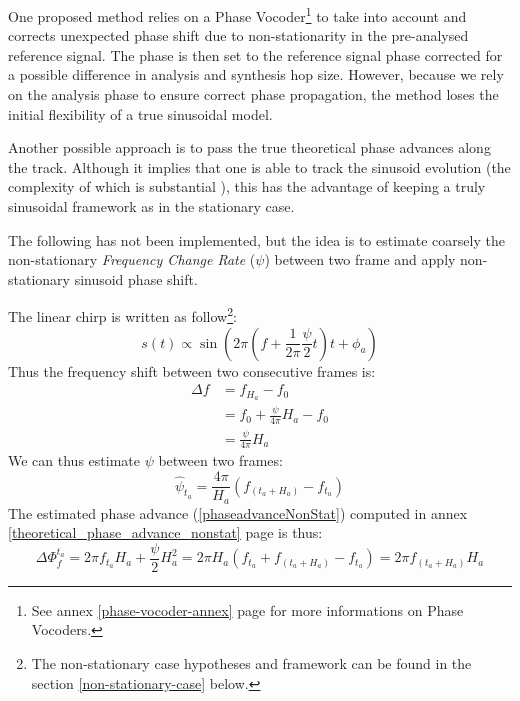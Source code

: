 \documentclass[]{article}
\begin{document}
One proposed method relies on a Phase Vocoder\footnote{See annex \ref{phase-vocoder-annex} page \pageref{phase-vocoder-annex} for more informations on Phase Vocoders.} to take into account and corrects unexpected phase shift due to non-stationarity in the pre-analysed reference signal. The phase is then set to the reference signal phase corrected for a possible difference in analysis and synthesis hop size. However, because we rely on the analysis phase to ensure correct phase propagation, the method loses the initial flexibility of a true sinusoidal model.

Another possible approach is to pass the true theoretical phase advances along the track. Although it implies that one is able to track the sinusoid evolution (the complexity of which is substantial \cite{mcaulay1986speech, serra1989system, karrer2006phavorit}), this has the advantage of keeping a truly sinusoidal framework as in the stationary case.

The following has not been implemented, but the idea is to estimate coarsely the non-stationary \emph{Frequency Change Rate} ($\psi$) between two frame and apply non-stationary sinusoid phase shift.

The linear chirp is written as follow\footnote{The non-stationary case hypotheses and framework can be found in the section \ref{non-stationary-case} below.}:
\begin{equation}
s(t) \propto \sin\left(2\pi\left(f  + \frac{1}{2\pi}\frac{\psi}{2} t\right)t + \phi_a\right)
\end{equation}
Thus the frequency shift between two consecutive frames is:
\begin{equation}
\begin{split}
\Delta f & = f_{H_a} - f_0\\
& = f_0 + \frac{\psi}{4\pi}H_a - f_0\\
& = \frac{\psi}{4\pi}H_a
\end{split}
\end{equation}
We can thus estimate $\psi$ between two frames:
\begin{equation}
\hat{\psi}_{t_a} = \frac{4\pi}{H_a}\left(f_{(t_a + H_a)} - f_{t_a} \right)
\end{equation}
The estimated phase advance (\ref{phaseadvanceNonStat}) computed in annex \ref{theoretical_phase_advance_nonstat} page \pageref{theoretical_phase_advance_nonstat} is thus:
\begin{equation}
\Delta \Phi_{f}^{t_a} = 2\pi f_{t_a} H_a + \frac{\psi}{2}H_a^2 = 2\pi H_a\left(f_{t_a} + f_{(t_a + H_a)} - f_{t_a} \right) = 2\pi f_{(t_a + H_a)} H_a
\end{equation}
\end{document}
